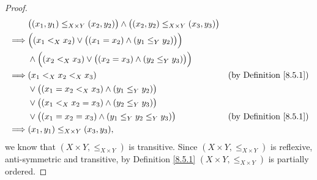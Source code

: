 \begin{proof}
\begin{align*}
                 & \big((x_1, y_1) \leq_{X \times Y} (x_2, y_2)\big) \land \big((x_2, y_2) \leq_{X \times Y} (x_3, y_3)\big)                                      \\
        \implies & \Big((x_1 <_X x_2) \lor \big((x_1 = x_2) \land (y_1 \leq_Y y_2)\big)\Big)                                                                      \\
                 & \land \Big((x_2 <_X x_3) \lor \big((x_2 = x_3) \land (y_2 \leq_Y y_3)\big)\Big)                                                                \\
        \implies & (x_1 <_X x_2 <_X x_3)                                                                                     & \text{(by Definition \ref{8.5.1})} \\
                 & \lor \big((x_1 = x_2 <_X x_3) \land (y_1 \leq_Y y_2)\big)                                                                                      \\
                 & \lor \big((x_1 <_X x_2 = x_3) \land (y_2 \leq_Y y_3)\big)                                                                                      \\
                 & \lor \big((x_1 = x_2 = x_3) \land (y_1 \leq_Y y_2 \leq_Y y_3)\big)                                        & \text{(by Definition \ref{8.5.1})} \\
        \implies & (x_1, y_1) \leq_{X \times Y} (x_3, y_3),
    \end{align*}
    we know that \((X \times Y, \leq_{X \times Y})\) is transitive.
    Since \((X \times Y, \leq_{X \times Y})\) is reflexive, anti-symmetric and transitive, by Definition \ref{8.5.1} \((X \times Y, \leq_{X \times Y})\) is partially ordered.


\end{proof}
